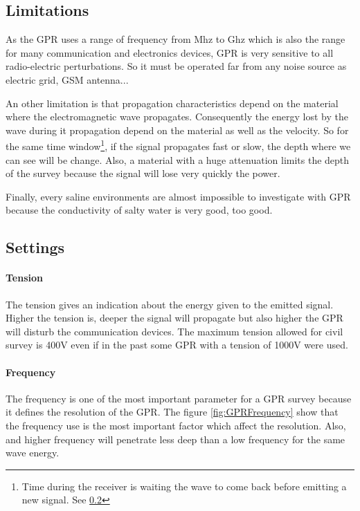 \subsection{Limitations}

As the GPR uses a range of frequency from Mhz to Ghz which is also the range for many communication and electronics devices, GPR is very sensitive to all radio-electric perturbations. So it must be operated far from any noise source as electric grid, GSM antenna...

An other limitation is that propagation characteristics depend on the material where the electromagnetic wave propagates. Consequently the energy lost by the wave during it propagation depend on the material as well as the velocity. So for the same time window\footnote{Time during the receiver is waiting the wave to come back before emitting a new signal. See \ref{SubSection:settings}}, if the signal propagates fast or slow, the depth where we can see will be change. Also, a material with a huge attenuation limits the depth of the survey because the signal will lose very quickly the power.

Finally, every saline environments are almost impossible to investigate with GPR because the conductivity of salty water is very good, too good\cite{UnderstandingDetection}.

\subsection{Settings} \label{SubSection:settings}


\paragraph{Tension} The tension gives an indication about the energy given to the emitted signal. Higher the tension is, deeper the signal will propagate but also higher the GPR will disturb the communication devices. The maximum tension allowed for civil survey is 400V even if in the past some GPR with a tension of 1000V were used. 

\paragraph{Frequency} The frequency is one of the most important parameter for a GPR survey because it defines the resolution of the GPR. The figure \ref{fig:GPRFrequency} show that the frequency use is the most important factor which affect the resolution. Also, and higher frequency will penetrate less deep than a low frequency for the same wave energy.

